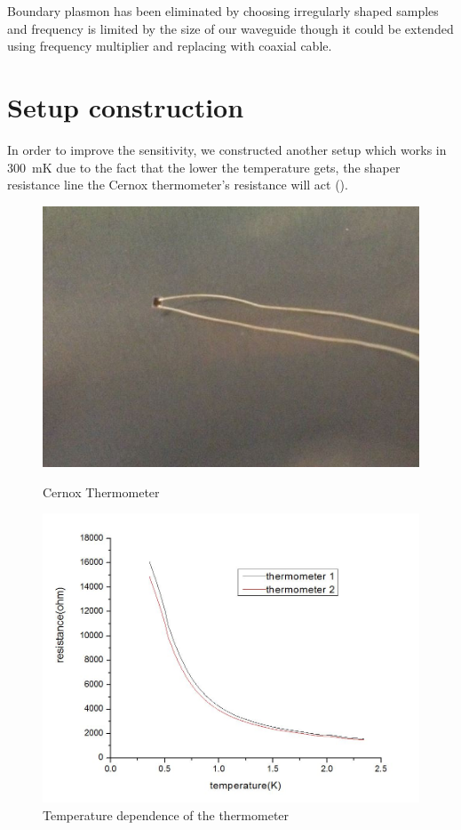 \documentclass[12pt]{ruthesis}
\begin{document}
Boundary plasmon has been eliminated by choosing irregularly shaped samples and frequency is limited by the size of our waveguide though it could be extended using frequency multiplier and replacing with coaxial cable. 

 
\section{Setup construction}\label{Construction}

In order to improve the sensitivity, we constructed another setup which works in \SI{300}{\milli\kelvin} due to the fact that the lower the temperature gets, the shaper resistance line the Cernox thermometer's resistance will act ().

\begin{figure}[!htb]\centering
   \begin{minipage}{0.49\textwidth}
     \includegraphics[width=\linewidth]{figures/thermometercx.JPG}
     \caption{Cernox Thermometer}\label{thermometer}
   \end{minipage}
   \begin {minipage}{0.49\textwidth}
     \includegraphics[width=\linewidth]{figures/R(T).JPG}
     \caption{Temperature dependence of the thermometer}\label{r(t)}
   \end{minipage}
\end{figure}
 
\end{document}
